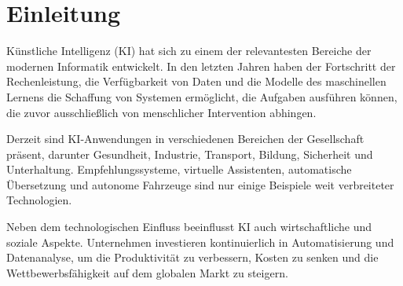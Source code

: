 \section{Einleitung}

Künstliche Intelligenz (KI) hat sich zu einem der relevantesten Bereiche der modernen Informatik entwickelt.
In den letzten Jahren haben der Fortschritt der Rechenleistung, die Verfügbarkeit von Daten und die Modelle
des maschinellen Lernens die Schaffung von Systemen ermöglicht, die Aufgaben ausführen können, die
zuvor ausschließlich von menschlicher Intervention abhingen.

Derzeit sind KI-Anwendungen in verschiedenen Bereichen der Gesellschaft präsent, darunter Gesundheit,
Industrie, Transport, Bildung, Sicherheit und Unterhaltung. Empfehlungssysteme,
virtuelle Assistenten, automatische Übersetzung und autonome Fahrzeuge sind nur einige Beispiele
weit verbreiteter Technologien.

Neben dem technologischen Einfluss beeinflusst KI auch wirtschaftliche und soziale Aspekte. Unternehmen
investieren kontinuierlich in Automatisierung und Datenanalyse, um die Produktivität zu verbessern,
Kosten zu senken und die Wettbewerbsfähigkeit auf dem globalen Markt zu steigern. 